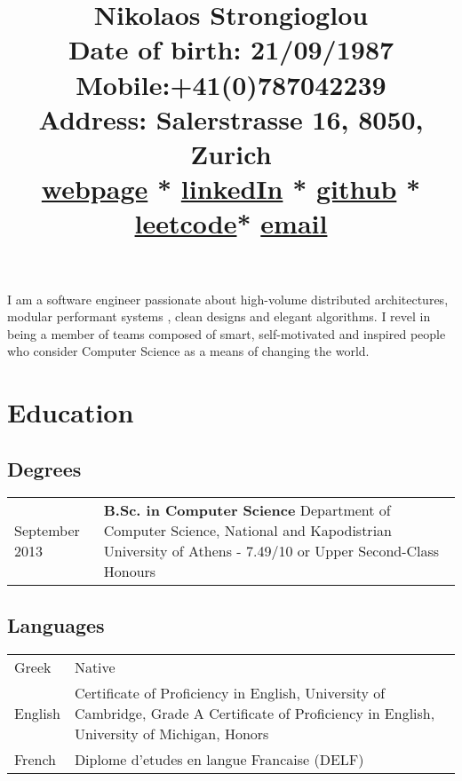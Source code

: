 \documentclass{article}
\begin{document}
	\title{\Huge{\vspace{-3.5cm} \color{NavyBlue}Nikolaos Strongioglou } \\ \small{\textbf{Date of birth}: 21/09/1987\\
			\textbf{Mobile}:+41(0)787042239\\
			\textbf{Address}: Salerstrasse 16, 8050, Zurich\\
			\href{http://tonyflow.github.io/}{webpage} * \href{https://www.linkedin.com/in/nikolaos-strongioglou/}{linkedIn} * \href{https://github.com/tonyflow}{github} * \href{https://leetcode.com/nikostr/}{leetcode}* \href{mailto:nikos.strongioglou@gmail.com}{email}
		} }
	\author{}
	\date{}
	\maketitle
	
	\vspace{-1.4cm}
	\noindent
	I am a software engineer passionate about high-volume distributed architectures, modular performant systems , clean designs and elegant algorithms. I revel in being a member of teams composed of smart, self-motivated and inspired people who consider Computer Science as a means of changing the world.

	\section*{\color{NavyBlue} Education}
	\vspace{-0.5cm}
	{\color{NavyBlue} \hrulefill}
	
	\subsection*{Degrees}
	\begin{tabular}{p{2cm}  p{12cm}}
		\small September 2013 & \textbf{B.Sc. in Computer Science} \newline
			Department of Computer Science, National and Kapodistrian University of Athens - 7.49/10 or Upper Second-Class Honours
	\end{tabular}

	\subsection*{Languages}
		\begin{tabular}{p{2cm}  p{12cm}}
			Greek & Native \\
			English & Certificate of Proficiency in English, University of Cambridge, Grade A \newline
							Certificate of Proficiency in English, University of Michigan, Honors \\
			French & Diplome d’etudes en langue Francaise (DELF)
		\end{tabular}
\end{document}
